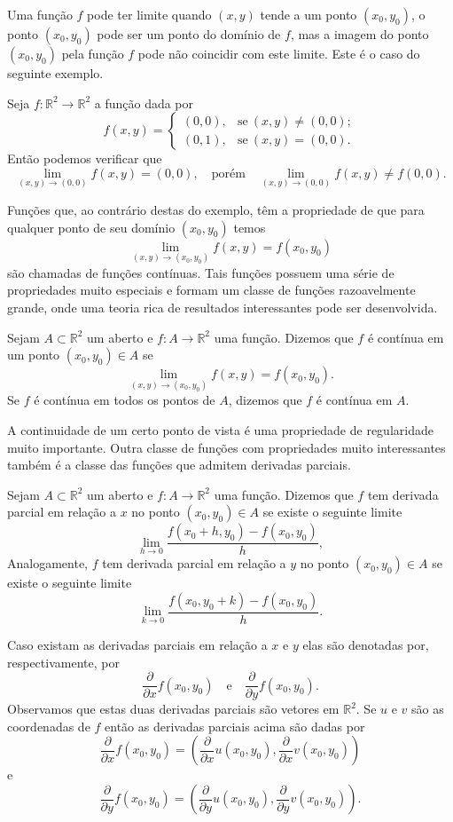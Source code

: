Uma função $f$ pode ter limite quando $(x,y)$ tende a um ponto $(x_0,y_0)$, o ponto 
$(x_0,y_0)$ pode ser um ponto do domínio de $f$, mas a imagem do ponto $(x_0,y_0)$ pela 
função $f$ pode não coincidir com este limite. Este é o caso do seguinte exemplo.

Seja $f:\mathbb{R}^2\to\mathbb{R}^2$ a função dada por
\[
f(x,y)
=
\begin{cases}
(0,0),&\text{se}\ (x,y)\neq (0,0);
\\
(0,1),&\text{se}\ (x,y)=(0,0).
\end{cases}
\]
Então podemos verificar que 
\[
\lim_{(x,y)\to (0,0)}f(x,y) = (0,0), 
\quad\text{porém}\quad 
\lim_{(x,y)\to (0,0)}f(x,y) \neq  f(0,0). 
\]

Funções que, ao contrário destas do exemplo, têm a propriedade de que 
para qualquer ponto de seu domínio $(x_0,y_0)$ temos
\[
\lim_{(x,y)\to (x_0,y_0)}f(x,y) =  f(x_0,y_0) 
\]
são chamadas de funções contínuas. Tais funções possuem uma série de propriedades muito 
especiais e formam um classe de funções razoavelmente grande, 
onde uma teoria rica de resultados 
interessantes pode ser desenvolvida.

\begin{definicao}\label{func-cont-plano}
Sejam $A\subset \mathbb{R}^2$ um aberto e $f:A\to\mathbb{R}^2$ uma função.
Dizemos que $f$ é contínua em um ponto $(x_0,y_0)\in A$ se 
\[
\lim_{(x,y)\to (x_0,y_0)}f(x,y) =  f(x_0,y_0).
\]
Se $f$ é contínua em todos os pontos de $A$, dizemos que $f$ é contínua em $A$.
\end{definicao}

A continuidade de um certo ponto de vista é uma propriedade de regularidade muito importante.
Outra classe de funções com propriedades muito interessantes também é a classe das funções 
que admitem derivadas parciais.

\begin{definicao}\label{def-deriv-parciais}
Sejam $A\subset \mathbb{R}^2$ um aberto e $f:A\to\mathbb{R}^2$ uma função.
Dizemos que $f$ tem derivada parcial em relação a $x$ no ponto $(x_0,y_0)\in A$
se existe o seguinte limite
\[
\lim_{h\to 0} \frac{f(x_0+h,y_0)-f(x_0,y_0)}{h},
\]
Analogamente, $f$ tem derivada parcial em relação a $y$ no ponto $(x_0,y_0)\in A$
se existe o seguinte limite 
\[
\lim_{k\to 0} \frac{f(x_0,y_0+k)-f(x_0,y_0)}{h}.
\]
\end{definicao}
Caso existam as derivadas parciais em relação a $x$ e $y$
elas são denotadas por, respectivamente, por
\[
\frac{\partial }{\partial x}f(x_0,y_0)
\quad \text{e}\quad
\frac{\partial }{\partial y}f(x_0,y_0).
\]
Observamos que estas duas derivadas parciais são vetores em $\mathbb{R}^2$.
Se $u$ e $v$ são as coordenadas de $f$ então as derivadas parciais acima são dadas por
\[
\frac{\partial }{\partial x}f(x_0,y_0)
=
\left(\frac{\partial }{\partial x}u(x_0,y_0), \frac{\partial }{\partial x}v(x_0,y_0)  \right)
\]
e
\[
\frac{\partial}{\partial y}f(x_0,y_0)
=
\left(\frac{\partial}{\partial y}u(x_0,y_0), \frac{\partial}{\partial y}v(x_0,y_0)  \right).
\]


